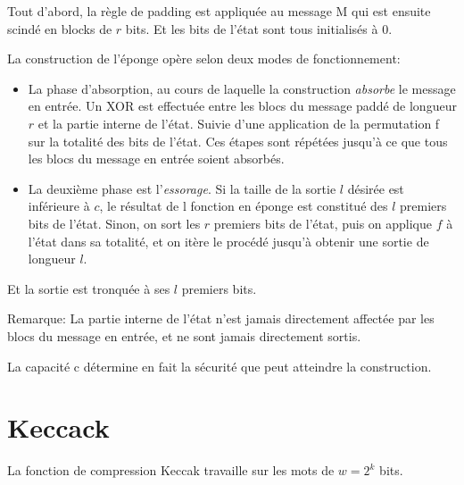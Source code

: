 \documentclass[10.5pt, a4paper, twoside, openright]{report}
\begin{document}
Tout d'abord, la règle de padding est appliquée au message M qui est ensuite scindé en blocks de $r$ bits.
Et les bits de l'état sont tous initialisés à 0. 

La construction de l'éponge opère selon deux modes de fonctionnement:
\begin{itemize}
\item{La phase d'absorption, au cours de laquelle la construction \emph{absorbe} le message en entrée. 
Un XOR est effectuée entre les blocs du message paddé de longueur $r$ et la partie interne de l'état. Suivie d'une application de la permutation f sur la totalité des bits de l'état.
Ces étapes sont répétées jusqu'à ce que tous les blocs du message en entrée soient absorbés.}

\item{La deuxième phase est l'\emph{essorage}. Si la taille de la sortie $l$ désirée est inférieure à $c$, le résultat de l fonction en éponge est constitué des $l$ premiers bits de l'état. Sinon, on sort les $r$ premiers bits de l'état, puis on applique $f$ à l'état dans sa totalité, et on itère le procédé jusqu'à obtenir une sortie de longueur $l$.}
\end{itemize} 
Et la sortie est tronquée à ses $l$ premiers bits.

Remarque: La partie interne de l'état n'est jamais directement affectée par les blocs du message en entrée, et ne sont jamais directement sortis.

La capacité c détermine en fait la sécurité que peut atteindre la construction. 


\section{Keccack}
La fonction de compression Keccak travaille sur les mots de $w=2^k$ bits.
\end{document}

